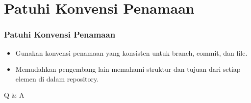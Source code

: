 \documentclass[aspectratio=169, table]{beamer}
\begin{document}
	\section{Patuhi Konvensi Penamaan}
	\begin{frame}[fragile]
		\frametitle{Patuhi Konvensi Penamaan}
		\begin{itemize}
			\item Gunakan konvensi penamaan yang konsisten untuk branch, commit, dan file.
			\item Memudahkan pengembang lain memahami struktur dan tujuan dari setiap elemen di dalam repository.
		\end{itemize}
	\end{frame}
	
	\begin{frame}
		\centering
		\Huge Q \& A
	\end{frame}
	
\end{document}
